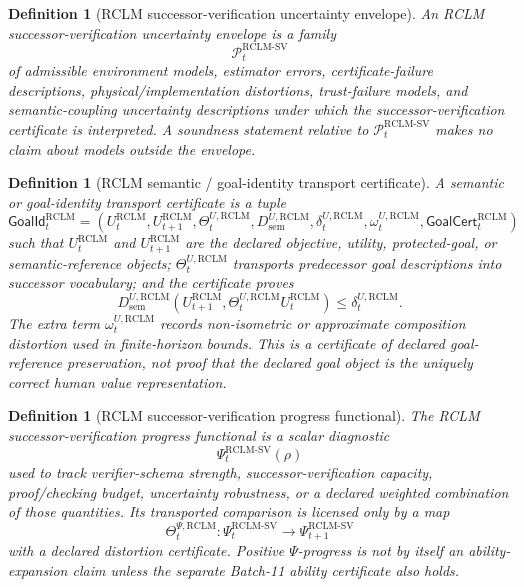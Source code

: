 \documentclass[11pt,a4paper]{article}
\newtheorem{definition}[theorem]{Definition}
\newcommand{\Pcal}{\mathcal P}
\newcommand{\RCLM}{\mathrm{RCLM}}
\newcommand{\sem}{\mathrm{sem}}
\begin{document}
\begin{definition}[RCLM successor-verification uncertainty envelope]
\label{def:rclm-batch12-sv-uncertainty-envelope}
An RCLM successor-verification uncertainty envelope is a family
\[
\Pcal_t^{\RCLM\text{-}\mathrm{SV}}
\]
of admissible environment models, estimator errors, certificate-failure descriptions, physical/implementation distortions, trust-failure models, and semantic-coupling uncertainty descriptions under which the successor-verification certificate is interpreted. A soundness statement relative to \(\Pcal_t^{\RCLM\text{-}\mathrm{SV}}\) makes no claim about models outside the envelope.
\end{definition}

\begin{definition}[RCLM semantic / goal-identity transport certificate]
\label{def:rclm-batch12-goal-identity-certificate}
A semantic or goal-identity transport certificate is a tuple
\[
\mathsf{GoalId}_t^{\RCLM}
=(U_t^{\RCLM},U_{t+1}^{\RCLM},\Theta_t^{U,\RCLM},D_{\sem}^{U,\RCLM},\delta_t^{U,\RCLM},\omega_t^{U,\RCLM},\mathsf{GoalCert}_t^{\RCLM})
\]
such that \(U_t^{\RCLM}\) and \(U_{t+1}^{\RCLM}\) are the declared objective, utility, protected-goal, or semantic-reference objects; \(\Theta_t^{U,\RCLM}\) transports predecessor goal descriptions into successor vocabulary; and the certificate proves
\[
D_{\sem}^{U,\RCLM}(U_{t+1}^{\RCLM},\Theta_t^{U,\RCLM}U_t^{\RCLM})
\le
\delta_t^{U,\RCLM}.
\]
The extra term \(\omega_t^{U,\RCLM}\) records non-isometric or approximate composition distortion used in finite-horizon bounds. This is a certificate of declared goal-reference preservation, not proof that the declared goal object is the uniquely correct human value representation.
\end{definition}

\begin{definition}[RCLM successor-verification progress functional]
\label{def:rclm-batch12-sv-progress-functional}
The RCLM successor-verification progress functional is a scalar diagnostic
\[
\Psi_t^{\RCLM\text{-}\mathrm{SV}}(\rho)
\]
used to track verifier-schema strength, successor-verification capacity, proof/checking budget, uncertainty robustness, or a declared weighted combination of those quantities. Its transported comparison is licensed only by a map
\[
\Theta_t^{\Psi,\RCLM}:\Psi_t^{\RCLM\text{-}\mathrm{SV}}\to\Psi_{t+1}^{\RCLM\text{-}\mathrm{SV}}
\]
with a declared distortion certificate. Positive \(\Psi\)-progress is not by itself an ability-expansion claim unless the separate Batch-11 ability certificate also holds.
\end{definition}
\end{document}

